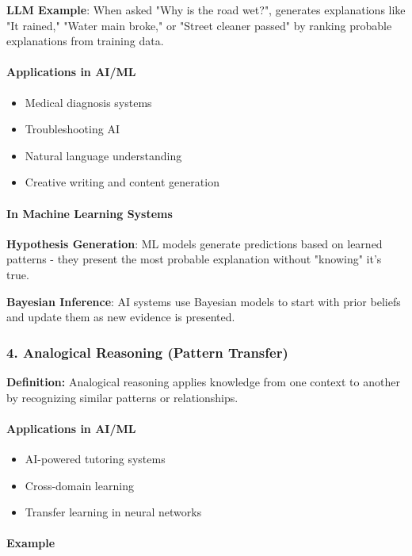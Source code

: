 \textbf{LLM Example}: When asked "Why is the road wet?", generates explanations like "It rained," "Water main broke," or "Street cleaner passed" by ranking probable explanations from training data.

\paragraph{Applications in AI/ML}

\begin{itemize}
\item Medical diagnosis systems
\item Troubleshooting AI
\item Natural language understanding
\item Creative writing and content generation
\end{itemize}

\paragraph{In Machine Learning Systems}

\textbf{Hypothesis Generation}: ML models generate predictions based on learned patterns - they present the most probable explanation without "knowing" it's true.

\textbf{Bayesian Inference}: AI systems use Bayesian models to start with prior beliefs and update them as new evidence is presented.

\subsubsection{4. Analogical Reasoning (Pattern Transfer)}

\textbf{Definition:} Analogical reasoning applies knowledge from one context to another by recognizing similar patterns or relationships.

\paragraph{Applications in AI/ML}

\begin{itemize}
\item AI-powered tutoring systems
\item Cross-domain learning
\item Transfer learning in neural networks
\end{itemize}

\paragraph{Example}

